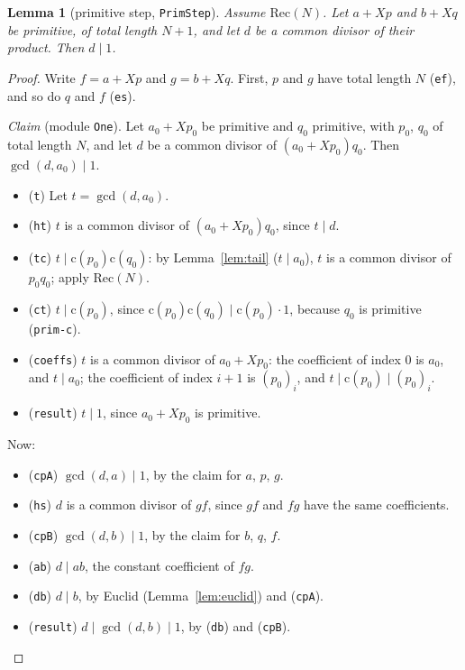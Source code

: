 \documentclass[11pt]{amsart}
\newtheorem{lemma}[theorem]{Lemma}
\theoremstyle{definition}
\theoremstyle{remark}
\newcommand{\nm}[1]{\textup{\texttt{#1}}}
\newcommand{\cont}{\mathrm{c}}
\newcommand{\gcdd}{\operatorname{gcd}}
\begin{document}
\begin{lemma}[primitive step, \nm{PrimStep}]\label{lem:primstep}
Assume $\mathrm{Rec}(N)$. Let $a+Xp$ and $b+Xq$ be primitive, of total
length $N+1$, and let $d$ be a common divisor of their product. Then
$d\mid1$.
\end{lemma}
\begin{proof}
Write $f = a+Xp$ and $g = b+Xq$. First, $p$ and $g$ have total length $N$
(\nm{ef}), and so do $q$ and $f$ (\nm{es}).

\emph{Claim} (module \nm{One}). Let $a_0+Xp_0$ be primitive and $q_0$
primitive, with $p_0$, $q_0$ of total length $N$, and let $d$ be a common
divisor of $(a_0+Xp_0)q_0$. Then $\gcdd(d,a_0)\mid1$.
\begin{itemize}
\item (\nm{t}) Let $t=\gcdd(d,a_0)$.
\item (\nm{ht}) $t$ is a common divisor of $(a_0+Xp_0)q_0$, since
  $t\mid d$.
\item (\nm{tc}) $t\mid\cont(p_0)\cont(q_0)$: by Lemma~\ref{lem:tail}
  ($t\mid a_0$), $t$ is a common divisor of $p_0q_0$; apply
  $\mathrm{Rec}(N)$.
\item (\nm{ct}) $t\mid\cont(p_0)$, since
  $\cont(p_0)\cont(q_0)\mid\cont(p_0)\cdot1$, because $q_0$ is primitive
  (\nm{prim-c}).
\item (\nm{coeffs}) $t$ is a common divisor of $a_0+Xp_0$: the
  coefficient of index $0$ is $a_0$, and $t\mid a_0$; the coefficient of
  index $i+1$ is $(p_0)_i$, and $t\mid\cont(p_0)\mid(p_0)_i$.
\item (\nm{result}) $t\mid1$, since $a_0+Xp_0$ is primitive.
\end{itemize}

Now:
\begin{itemize}
\item (\nm{cpA}) $\gcdd(d,a)\mid1$, by the claim for $a$, $p$, $g$.
\item (\nm{hs}) $d$ is a common divisor of $gf$, since $gf$ and $fg$ have
  the same coefficients.
\item (\nm{cpB}) $\gcdd(d,b)\mid1$, by the claim for $b$, $q$, $f$.
\item (\nm{ab}) $d\mid ab$, the constant coefficient of $fg$.
\item (\nm{db}) $d\mid b$, by Euclid (Lemma~\ref{lem:euclid}) and
  (\nm{cpA}).
\item (\nm{result}) $d\mid\gcdd(d,b)\mid1$, by (\nm{db}) and
  (\nm{cpB}).\qedhere
\end{itemize}
\end{proof}
\end{document}
